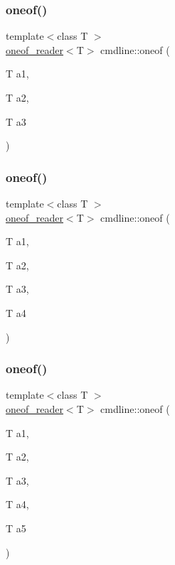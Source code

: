 \mbox{\label{namespacecmdline_a5eb83c76445bb52917cd502939988f17}} 
\subsubsection{\texorpdfstring{oneof()}{oneof()}\hspace{0.1cm}{\footnotesize\ttfamily [3/10]}}
{\footnotesize\ttfamily template$<$class T $>$ \\
\mbox{\hyperlink{structcmdline_1_1oneof__reader}{oneof\+\_\+reader}}$<$T$>$ cmdline\+::oneof (\begin{DoxyParamCaption}\item[{T}]{a1,  }\item[{T}]{a2,  }\item[{T}]{a3 }\end{DoxyParamCaption})}

\mbox{\label{namespacecmdline_ada9e08ffe87130e9e0bc97c8ae9e37ed}} 
\subsubsection{\texorpdfstring{oneof()}{oneof()}\hspace{0.1cm}{\footnotesize\ttfamily [4/10]}}
{\footnotesize\ttfamily template$<$class T $>$ \\
\mbox{\hyperlink{structcmdline_1_1oneof__reader}{oneof\+\_\+reader}}$<$T$>$ cmdline\+::oneof (\begin{DoxyParamCaption}\item[{T}]{a1,  }\item[{T}]{a2,  }\item[{T}]{a3,  }\item[{T}]{a4 }\end{DoxyParamCaption})}

\mbox{\label{namespacecmdline_ae68ed509566250984be762f4130b1598}} 
\subsubsection{\texorpdfstring{oneof()}{oneof()}\hspace{0.1cm}{\footnotesize\ttfamily [5/10]}}
{\footnotesize\ttfamily template$<$class T $>$ \\
\mbox{\hyperlink{structcmdline_1_1oneof__reader}{oneof\+\_\+reader}}$<$T$>$ cmdline\+::oneof (\begin{DoxyParamCaption}\item[{T}]{a1,  }\item[{T}]{a2,  }\item[{T}]{a3,  }\item[{T}]{a4,  }\item[{T}]{a5 }\end{DoxyParamCaption})}

